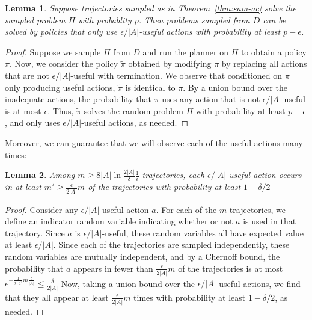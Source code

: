 \documentclass[letterpaper]{article} %
\newtheorem{lemma}{Lemma}
\begin{document}
\begin{lemma}\label{lem:only-useful}
Suppose trajectories sampled as in Theorem~\ref{thm:sam-ac} solve the sampled problem $\Pi$ with probablity $p$.
Then problems sampled from $D$ can be solved by policies that only use $\epsilon/|A|$-useful actions with probability at least $p-\epsilon$.
\end{lemma}
\begin{proof}
Suppose we sample $\Pi$ from $D$ and run the planner on $\Pi$ to obtain a policy $\pi$. Now, we consider the policy $\tilde{\pi}$ obtained by modifying $\pi$ by replacing all actions that are not $\epsilon/|A|$-useful with termination. We observe that conditioned on $\pi$ only producing useful actions, $\tilde{\pi}$ is identical to $\pi$. By a union bound over the inadequate actions, the probability that $\pi$ uses any action that is not $\epsilon/|A|$-useful is at most $\epsilon$.  Thus, $\tilde{\pi}$ solves the random problem $\Pi$ with probability at least $p-\epsilon$, and only uses $\epsilon/|A|$-useful actions, as needed.
\end{proof}

\noindent
Moreover, 
we can guarantee that we will observe each of the useful actions many times:

\begin{lemma}\label{lem:many-useful}
Among  $m \geq 8|A|\ln\frac{2|A|}{\delta}\frac{1}{\epsilon}$
trajectories, each $\epsilon/|A|$-useful action occurs in at least
$m' \geq \frac{\epsilon}{2|A|}m$
of the trajectories with probability at least $1-\delta/2$
\end{lemma}
\begin{proof}
Consider any $\epsilon/|A|$-useful action $a$. For each of the $m$ trajectories, we define an indicator random variable indicating whether or not $a$ is used in that trajectory. Since $a$ is $\epsilon/|A|$-useful, these random variables all have expected value at least $\epsilon/|A|$. Since each of the trajectories are sampled independently, these random variables are mutually independent, and by a Chernoff bound, the probability that $a$ appears in fewer than $\frac{\epsilon}{2|A|}m$ of the trajectories is at most
$
e^{-\frac{1}{2\cdot 2^2}m\frac{\epsilon}{|A|}}\leq\frac{\delta}{2|A|}
$
Now, taking a union bound over the $\epsilon/|A|$-useful actions, we find that they all appear at least $\frac{\epsilon}{2|A|}m$ times with probability at least $1-\delta/2$, as needed.
\end{proof}
\end{document}
